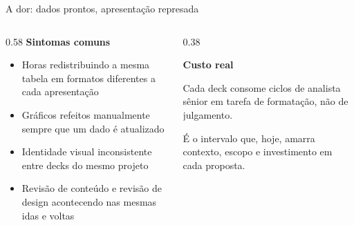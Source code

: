 \documentclass[aspectratio=169, 8pt, t]{beamer}
\begin{document}
\begin{frame}{A dor: dados prontos, apresentação represada}
  \vspace{4mm}
  \begin{columns}[T, onlytextwidth]
    \begin{column}{0.58\textwidth}
      {\bfseries Sintomas comuns}\par\vspace{1.5mm}
      \begin{itemize}
        \item Horas redistribuindo a mesma tabela em formatos diferentes a cada apresentação
        \item Gráficos refeitos manualmente sempre que um dado é atualizado
        \item Identidade visual inconsistente entre decks do mesmo projeto
        \item Revisão de conteúdo e revisão de design acontecendo nas mesmas idas e voltas
      \end{itemize}
    \end{column}
    \begin{column}{0.38\textwidth}
      \vspace{4mm}
      \begin{amcard}
        {\bfseries Custo real}\par\vspace{1.5mm}
        Cada deck consome ciclos de analista sênior em tarefa de formatação, não de julgamento.\par\vspace{2mm}
        É o intervalo que, hoje, amarra contexto, escopo e investimento em cada proposta.
      \end{amcard}
    \end{column}
  \end{columns}
\end{frame}
\end{document}
